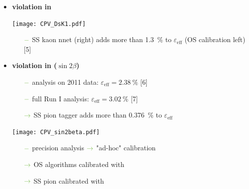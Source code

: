 {\begin{minipage}{0.474\boxwidth}
\begin{itemize}
\item\textbf{\CP violation in \BsToDsK}

\vspace{-1.7em}
\begin{flushleft}
\texttt{[image: CPV\_DsK1.pdf]}
\end{flushleft}
\vspace{-2.5em}

	\begin{itemize}
	\setlength\itemsep{0.01em}
	\setlength{\itemindent}{-.11in}
	\item[${\color{tu_gruen}-}$] SS kaon nnet (right) adds more than \SI{1.3}{\%} to $\varepsilon_\text{eff}$ (OS calibration left) [5]
	\end{itemize}
\end{itemize}
\end{minipage}
\vspace{0.7em}
\hfill
\begin{minipage}{0.474\boxwidth}
\vspace{-1.2em}
\begin{itemize}
\item\textbf{\CP violation in \BdToJPsiKS ($\sin2\beta$)}
	\begin{itemize}
	\setlength\itemsep{0.01em}
	\setlength{\itemindent}{-.11in}
	\item[${\color{tu_gruen}-}$] analysis on \num{2011} data: $\varepsilon_\text{eff}=\SI{2.38}{\%}$ [6]
	\item[${\color{tu_gruen}-}$] full Run I analysis: $\varepsilon_\text{eff}=\SI{3.02}{\%}$ [7] 
	\setlength{\itemindent}{.05in} 
	\item[${\color{tu_gruen}\rightarrow}$] SS pion tagger adds more than \SI{0.376}{\%} to $\varepsilon_\text{eff}$ 
	\end{itemize}
	
\vspace{-1.7em}
\begin{center}
\texttt{[image: CPV\_sin2beta.pdf]}
\end{center}
\vspace{-2.5em}

	\begin{itemize}
	\setlength{\itemindent}{-.11in}
	\setlength\itemsep{0.01em}
	\item[${\color{tu_gruen}-}$] precision analysis \hspace{0.1em}${\color{tu_gruen}\rightarrow}$ "ad-hoc" calibration
	\setlength{\itemindent}{.05in}
	\item[${\color{tu_gruen}\rightarrow}$] OS algorithms calibrated with \BuToJPsiKp 
	\item[${\color{tu_gruen}\rightarrow}$] SS pion calibrated with \BdToJPsiKst
	\end{itemize}


\end{itemize}
\end{minipage}}
